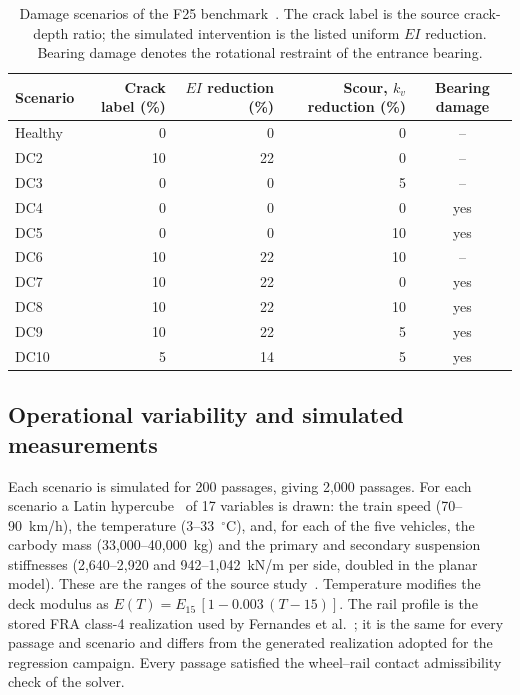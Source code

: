 \begin{table}[htbp]
\centering
\caption{Damage scenarios of the F25 benchmark~\cite{fernandes2025early}. The
crack label is the source crack-depth ratio; the simulated intervention is the
listed uniform $EI$ reduction. Bearing damage denotes the rotational restraint
of the entrance bearing.}
\label{tab:f25_scenarios}
\small
\begin{tabular}{lrrrc}
\toprule
Scenario & Crack label (\%) & $EI$ reduction (\%) & Scour, $k_v$ reduction (\%) & Bearing damage \\
\midrule
Healthy & 0 & 0 & 0 & -- \\
DC2 & 10 & 22 & 0 & -- \\
DC3 & 0 & 0 & 5 & -- \\
DC4 & 0 & 0 & 0 & yes \\
DC5 & 0 & 0 & 10 & yes \\
DC6 & 10 & 22 & 10 & -- \\
DC7 & 10 & 22 & 0 & yes \\
DC8 & 10 & 22 & 10 & yes \\
DC9 & 10 & 22 & 5 & yes \\
DC10 & 5 & 14 & 5 & yes \\
\bottomrule
\end{tabular}
\end{table}

\subsection{Operational variability and simulated measurements}

Each scenario is simulated for 200 passages, giving 2,000 passages. For each
scenario a Latin hypercube~\cite{mckay1979comparison} of 17 variables is drawn:
the train speed (70--90~km/h), the temperature (3--33~$^{\circ}$C), and, for each
of the five vehicles, the carbody mass (33,000--40,000~kg) and the primary and
secondary suspension stiffnesses (2,640--2,920 and 942--1,042~kN/m per side,
doubled in the planar model). These are the ranges of the source
study~\cite{fernandes2025early}. Temperature modifies the deck modulus as
$E(T)=E_{15}\,[1-0.003\,(T-15)]$. The rail profile is the stored FRA class-4
realization used by Fernandes et al.~\cite{fernandes2024driveby,
fernandes2025early}; it is the same for every passage and scenario and differs
from the generated realization adopted for the regression campaign. Every
passage satisfied the wheel--rail contact admissibility check of the solver.

